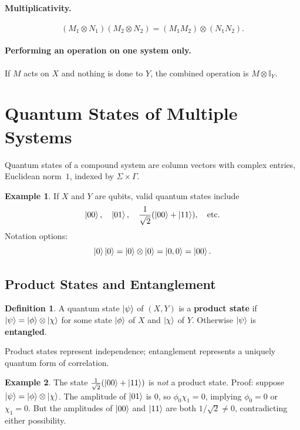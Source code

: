 \documentclass[11pt]{article}
\theoremstyle{definition}
\newtheorem{definition}{Definition}[section]
\newtheorem{example}{Example}[section]
\begin{document}
\paragraph{Multiplicativity.}
\[
    (M_1\otimes N_1)(M_2\otimes N_2) = (M_1 M_2)\otimes(N_1 N_2).
\]

\paragraph{Performing an operation on one system only.}
If $M$ acts on $X$ and nothing is done to $Y$, the combined operation is $M\otimes\mathbb{I}_Y$.

\section{Quantum States of Multiple Systems}

Quantum states of a compound system are column vectors with complex entries, Euclidean norm~$1$, indexed by $\Sigma\times\Gamma$.

\begin{example}
If $X$ and $Y$ are qubits, valid quantum states include
\[
    \ket{00},\quad \ket{01},\quad \frac{1}{\sqrt{2}}(\ket{00}+\ket{11}),\quad\text{etc.}
\]
Notation options:
\[
    \ket{0}\ket{0} = \ket{0}\otimes\ket{0} = \ket{0,0} = \ket{00}.
\]
\end{example}

\subsection{Product States and Entanglement}

\begin{definition}
A quantum state $\ket{\psi}$ of $(X,Y)$ is a \textbf{product state} if $\ket{\psi}=\ket{\phi}\otimes\ket{\chi}$ for some state $\ket{\phi}$ of $X$ and $\ket{\chi}$ of $Y$.  Otherwise $\ket{\psi}$ is \textbf{entangled}.
\end{definition}

Product states represent independence; entanglement represents a uniquely quantum form of correlation.

\begin{example}
The state $\frac{1}{\sqrt{2}}(\ket{00}+\ket{11})$ is \emph{not} a product state.  Proof: suppose $\ket{\psi}=\ket{\phi}\otimes\ket{\chi}$.  The amplitude of $\ket{01}$ is $0$, so $\phi_0\chi_1=0$, implying $\phi_0=0$ or $\chi_1=0$.  But the amplitudes of $\ket{00}$ and $\ket{11}$ are both $1/\sqrt{2}\neq 0$, contradicting either possibility.
\end{example}
\end{document}

